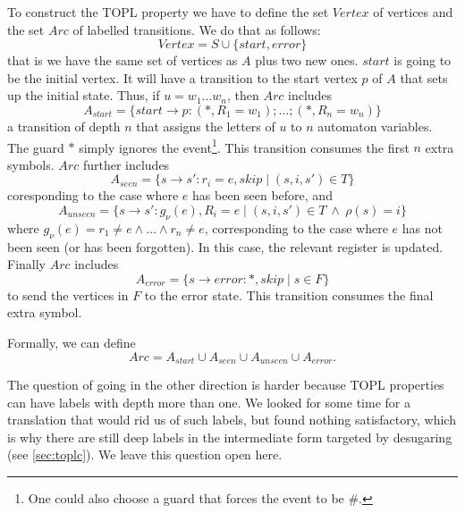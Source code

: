 \newcommand{\Vertex}{\mathit{Vertex}}
\newcommand{\Arc}{\mathit{Arc}}
\newcommand{\sstart}{\mathit{start}}
\newcommand{\serror}{\mathit{error}}
\newcommand{\seen}{\mathit{seen}}
\newcommand{\unseen}{\mathit{unseen}}
To construct the TOPL property we have to define the set $\Vertex$
of vertices and the set $\Arc$ of labelled transitions. We do that as follows:
\[
\Vertex = S \cup \{\sstart, \serror\}
\]
that is we have the same set of vertices as $A$ plus two new
ones. $start$ is going to be the initial vertex. It will have a
transition to the start vertex $p$ of $A$ that sets up the
initial state. Thus, if $u = w_1\ldots w_n$, then $\Arc$ includes
\[
A_{\sstart} = \{\sstart \to p: (*,R_1=w_1);\ldots;(*,R_n=w_n) \}
\]
a transition of depth $n$ that assigns the letters of $u$
to $n$ automaton variables. The guard $*$ simply ignores the
event\footnote{One could also choose a guard that forces the event
to be \#.}. This transition consumes the first $n$ extra
symbols. $\Arc$ further includes
\[
A_{\seen} = \{s\to s': r_i=e, skip \mid (s, i, s') \in T \}
\]
coresponding to the case where $e$ has been seen before, and
\[
A_{unseen} = \{s\to s'{:} g_\nu(e), R_i{=}e \mid (s, i, s') \in T\ \land\ \rho(s){=}i \}
\]
where $g_\nu(e) = r_1 \neq e \land \ldots \land r_n \neq e$,
corresponding to the case where $e$ has not been seen (or has been
forgotten). In this case, the relevant register is
updated. Finally $\Arc$ includes
\[
A_{\serror} = \{s\to \serror: *, skip \mid s\in F \}
\]
to send the vertices in $F$ to the error state. This transition
consumes the final extra symbol.

Formally, we can define
\[
\Arc = A_{\sstart} \cup A_{\seen} \cup A_{\unseen} \cup A_{\serror}.
\]

The question of going in the other direction is harder because TOPL
properties can have labels with depth more than one. We looked for some
time for a translation that would rid us of such labels, but found
nothing satisfactory, which is why there are still deep labels in the
intermediate form targeted by desugaring (see \autoref{sec:toplc}). We leave this
question open here.
